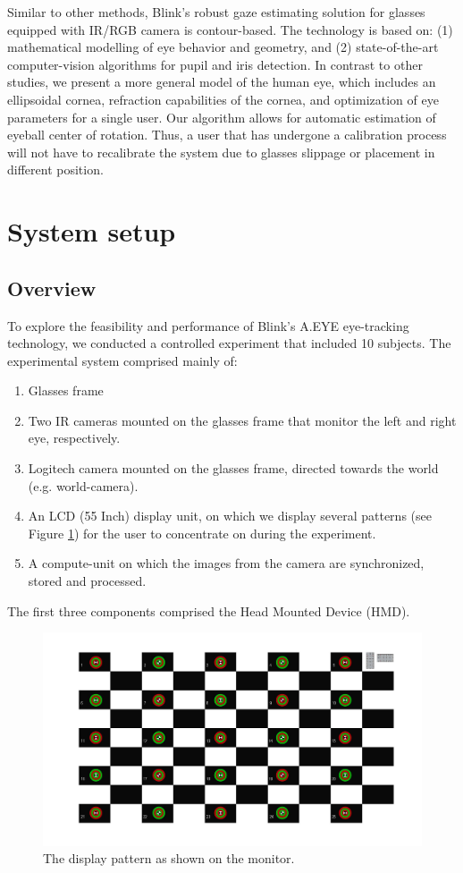 \documentclass{article}
\begin{document}
Similar to other methods, Blink's robust gaze estimating solution for glasses equipped with IR/RGB camera is contour-based.  The technology is based on: (1) mathematical modelling of eye behavior and geometry, and (2) state-of-the-art computer-vision algorithms for pupil and iris detection.  In contrast to other studies, we present a more general model of the human eye, which includes an ellipsoidal cornea, refraction capabilities of the cornea, and optimization of eye parameters for a single user.  Our algorithm allows for automatic estimation of eyeball center of rotation. Thus, a user that has undergone a calibration process will not have to recalibrate the system due to glasses slippage or placement in different position.

\section{System setup}
\subsection{Overview}
To explore the feasibility and performance of Blink's A.EYE eye-tracking technology, we conducted a controlled experiment that included 10 subjects.  The experimental system comprised mainly of:
\begin{enumerate}
    \item Glasses frame
    \item Two IR cameras mounted on the glasses frame that monitor the left and right eye, respectively.
    \item Logitech camera mounted on the glasses frame, directed towards the world (e.g. world-camera).
    \item An LCD (55 Inch) display unit, on which we display several patterns (see Figure \ref{fig:pattern_monitor}) for the user to concentrate on during the experiment.
    \item A compute-unit on which the images from the camera are synchronized, stored and processed.
\end{enumerate}
The first three components comprised the Head Mounted Device (HMD).
\begin{figure}[h!]
    \center
    \includegraphics[scale=0.5]{./Pics/pattern_por}
    \caption{The display pattern as shown on the monitor.}
    \label{fig:pattern_monitor}
\end{figure}
\end{document}
